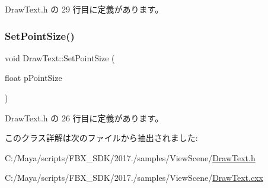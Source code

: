  Draw\+Text.\+h の 29 行目に定義があります。

\mbox{\label{class_draw_text_a7914906420b5794102a873da4188ba24}} 
\subsubsection{\texorpdfstring{Set\+Point\+Size()}{SetPointSize()}}
{\footnotesize\ttfamily void Draw\+Text\+::\+Set\+Point\+Size (\begin{DoxyParamCaption}\item[{float}]{p\+Point\+Size }\end{DoxyParamCaption})\hspace{0.3cm}{\ttfamily [inline]}}



 Draw\+Text.\+h の 26 行目に定義があります。



このクラス詳解は次のファイルから抽出されました\+:\begin{DoxyCompactItemize}
\item 
C\+:/\+Maya/scripts/\+F\+B\+X\+\_\+\+S\+D\+K/2017./samples/\+View\+Scene/\hyperlink{_draw_text_8h}{Draw\+Text.\+h}\item 
C\+:/\+Maya/scripts/\+F\+B\+X\+\_\+\+S\+D\+K/2017./samples/\+View\+Scene/\hyperlink{_draw_text_8cxx}{Draw\+Text.\+cxx}\end{DoxyCompactItemize}
